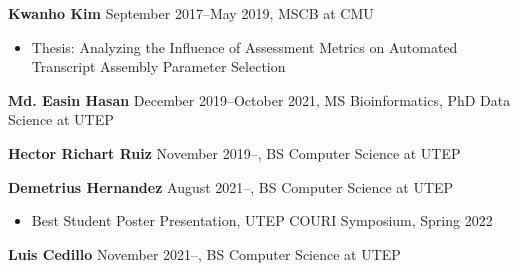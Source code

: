 \documentclass[10pt,letterpaper]{article}
\newcommand{\bigdot}{$\cdot$\xspace}
\begin{document}
\textbf{Kwanho Kim} September 2017--May 2019, MSCB at CMU
\begin{itemize}
\item Thesis: Analyzing the Influence of Assessment Metrics on Automated Transcript Assembly Parameter Selection
\end{itemize}
%
%
%
%

\textbf{Md. Easin Hasan} December 2019--October 2021, MS Bioinformatics, PhD Data Science at UTEP

\textbf{Hector Richart Ruiz} November 2019--, BS Computer Science at UTEP

\textbf{Demetrius Hernandez} August 2021--, BS Computer Science at UTEP
\begin{itemize}
\item Best Student Poster Presentation, UTEP COURI Symposium, Spring 2022 
\end{itemize}

\textbf{Luis Cedillo} November 2021--, BS Computer Science at UTEP


\end{document}
